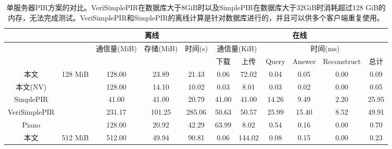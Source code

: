 \begin{table}[]
    \caption{单服务器PIR方案的对比。VeriSimplePIR在数据库大于8GiB时以及SimplePIR在数据库大于32GiB时消耗超过128 GiB的内存，无法完成测试。VeriSimplePIR和SimplePIR的离线计算是针对数据库进行的，并且可以供多个客户端重复使用。}
    \label{tab:single-server-evaluation}
    \begin{tabular}{@{}cc|ccc|cccccc@{}}
        \toprule
                      &                           & \multicolumn{3}{c|}{离线} & \multicolumn{6}{c}{在线}                                                                                                                    \\ \midrule
                      &                           & 通信量(MiB)                     & 存储(MiB)                & 时间(s)  & \multicolumn{2}{c|}{通信量(KiB)} & \multicolumn{4}{c}{时间(ms)}                                          \\
                      &                           &                              &                            &          & 下载                      & \multicolumn{1}{c|}{上传}  & Query  & Answer & Reconstruct & 总计  \\ \midrule
        本文         & \multirow{5}{*}{128 MiB} & 128.00                       & 23.89                      & 21.43    & 0.06                          & \multicolumn{1}{c|}{72.02}   & 0.04   & 0.05   & 0.00        & 0.09   \\
        本文(NV)     &                           & 128.00                       & 14.10                      & 10.02    & 0.03                          & \multicolumn{1}{c|}{8.01}    & 0.03   & 0.02   & 0.00        & 0.05   \\
        SimplePIR     &                           & 41.00                        & 41.00                      & 20.79    & 41.00                         & \multicolumn{1}{c|}{41.00}   & 14.26  & 9.49   & 2.20        & 25.95  \\
        VeriSimplePIR &                           & 231.17                       & 101.25                     & 285.06   & 50.63                         & \multicolumn{1}{c|}{50.57}   & 25.99  & 15.40  & 8.52        & 49.91  \\
        Piano         &                           & 128.00                       & 20.92                      & 42.29    & 63.99                         & \multicolumn{1}{c|}{8.02}    & 0.54   & 0.16   & 0.00        & 0.70   \\ \midrule
        本文         & \multirow{5}{*}{512 MiB} & 512.00                       & 49.94                      & 90.81    & 0.06                          & \multicolumn{1}{c|}{144.02}  & 0.08   & 0.15   & 0.00        & 0.23   \\

\end{tabular}
\end{table}
